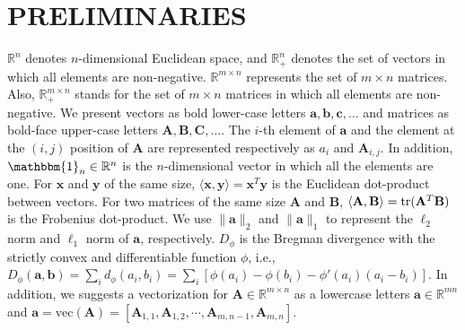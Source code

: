 \documentclass[twoside]{article}
\theoremstyle{plain}
\newcommand{\one}{\mathbbm{1}}
\newcommand{\mat}[1]{\mathbf{#1}}
\renewcommand{\vec}[1]{\bm{#1}}
\begin{document}
\section{PRELIMINARIES}
\label{sec:pre}

$\mathbb{R}^n$ denotes $n$-dimensional Euclidean space, and $\mathbb{R}^n_+$ denotes the set of vectors in which all elements are non-negative. $\mathbb{R}^{m \times n}$ represents the set of $m \times n$ matrices. Also, $\mathbb{R}^{m \times n}_+$ stands for the set of $m \times n$ matrices in which all elements are non-negative. We present vectors as bold lower-case letters $\vec{a},\vec{b},\vec{c},\dots$ and matrices as bold-face upper-case letters $\mat{A},\mat{B},\mat{C},\dots$. The $i$-th element of $\vec{a}$ and the element at the $(i,j)$ position of $\mat{A}$ are represented respectively as $a_i$ and $\mat{A}_{i,j}$. In addition, $\one_n \in \mathbb{R}^n$ is the $n$-dimensional vector in which all the elements are one. For $\vec{x}$ and $\vec{y}$ of the same size, $\langle \vec{x},\vec{y} \rangle = \vec{x}^T\vec{y}$ is the Euclidean dot-product between vectors. For two matrices of the same size $\mat{A}$ and $\mat{B}$, $\langle \mat{A},\mat{B}\rangle={\rm tr}(\mat{A}^T\mat{B})$ is the Frobenius dot-product. We use $\|\vec{a}\|_2$ and $\|\vec{a}\|_1$ to represent the $\ell_2$ norm and $\ell_1$ norm of $\vec{a}$, respectively. 
$D_\phi$ is the Bregman divergence with the strictly convex and differentiable function $\phi$, i.e., $D_\phi(\vec{a},\vec{b})=\sum_{i} d_\phi(a_i, b_i)=\sum_i [\phi(a_i) - \phi(b_i) - \phi'(a_i)(a_i -b_i)]$. In addition, we suggests a vectorization for $\mat{A} \in \mathbb{R}^{m \times n}$ as a lowercase letters $\vec{a} \in \mathbb{R}^{mn}$ and $\vec{a}=\text{vec}(\mat{A})=[\mat{A}_{1,1}, \mat{A}_{1,2}, \cdots, \mat{A}_{m,n-1}, \mat{A}_{m,n}]$.
 
\end{document}
